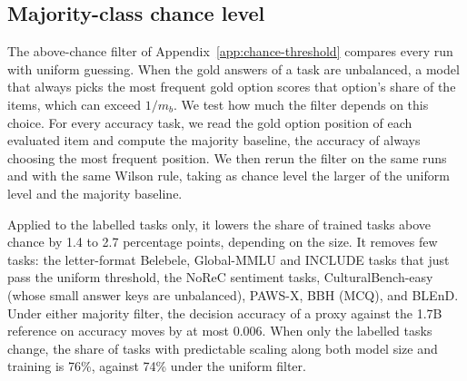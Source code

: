 \clearpage
\subsection{Majority-class chance level}
\label{app:majority_chance}

The above-chance filter of Appendix~\ref{app:chance-threshold} compares every run with uniform guessing. When the gold answers of a task are unbalanced, a model that always picks the most frequent gold option scores that option's share of the items, which can exceed $1/m_b$. We test how much the filter depends on this choice. For every accuracy task, we read the gold option position of each evaluated item and compute the majority baseline, the accuracy of always choosing the most frequent position. We then rerun the filter on the same runs and with the same Wilson rule, taking as chance level the larger of the uniform level and the majority baseline. 


Applied to the labelled tasks only, it lowers the share of trained tasks above chance by 1.4 to 2.7 percentage points, depending on the size. It removes few tasks: the letter-format Belebele, Global-MMLU and INCLUDE tasks that just pass the uniform threshold, the NoReC sentiment tasks, CulturalBench-easy (whose small answer keys are unbalanced), PAWS-X, BBH (MCQ), and BLEnD. Under either majority filter, the decision accuracy of a proxy against the 1.7B reference on accuracy moves by at most 0.006. When only the labelled tasks change, the share of tasks with predictable scaling along both model size and training is 76\%, against 74\% under the uniform filter.

%
